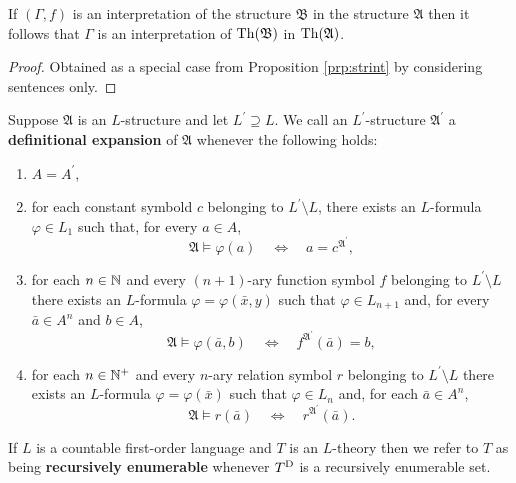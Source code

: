 \begin{cor}
	If $(\Gamma,f)$ is an interpretation of the structure $\mathfrak{B}$ in the structure $\mathfrak{A}$ then it follows that $\Gamma$ is an interpretation of $\operatorname{Th}(\mathfrak{B})$ in $\operatorname{Th}(\mathfrak{A})$.
\end{cor}
\begin{proof}
	Obtained as a special case from Proposition \ref{prp:strint} by considering sentences only.
\end{proof}

\begin{dfn}
	Suppose $\mathfrak{A}$ is an $L$-structure and let $L^\prime\supseteq L$.  We call an $L^\prime$-structure $\mathfrak{A}^\prime$ a \textbf{definitional expansion} of $\mathfrak{A}$ whenever the following holds:
	\begin{enumerate}
		\item	$A=A^\prime$,
		\item	for each constant symbold $c$ belonging to $L^\prime\setminus L$, there exists an $L$-formula $\varphi\in L_1$ such that, for every $a\in A$,
		      \begin{equation}
			      \mathfrak{A}\models\varphi(a)\quad\iff\quad a=c^{\mathfrak{A}^\prime},
		      \end{equation}
		\item	for each $n\in\mathbb{N}$ and every $(n+1)$-ary function symbol $f$ belonging to $L^\prime\setminus L$ there exists an $L$-formula $\varphi=\varphi(\bar{x},y)$ such that $\varphi\in L_{n+1}$ and, for every $\bar{a}\in A^n$ and $b\in A$,
		      \begin{equation}
			      \mathfrak{A}\models\varphi(\bar{a},b)\quad\iff\quad f^{\mathfrak{A}^\prime}(\bar{a})=b,
		      \end{equation}
		\item	for each $n\in\mathbb{N}^{+}$ and every $n$-ary relation symbol $r$ belonging to $L^\prime\setminus L$ there exists an $L$-formula $\varphi=\varphi(\bar{x})$ such that $\varphi\in L_n$ and, for each $\bar{a}\in A^n$,
		      \begin{equation}
			      \mathfrak{A}\models r(\bar{a})\quad\iff\quad r^{\mathfrak{A}^\prime}(\bar{a}).
		      \end{equation}
	\end{enumerate}
\end{dfn}

\begin{dfn}
	If $L$ is a countable first-order language and $T$ is an $L$-theory then we refer to $T$ as being \textbf{recursively enumerable} whenever ${T}^\mathrm{D}$ is a recursively enumerable set.
\end{dfn}

